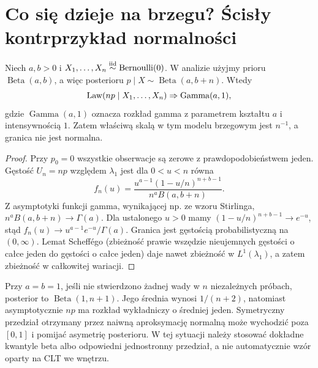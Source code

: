 \section{Co się dzieje na brzegu? Ścisły kontrprzykład normalności}
\begin{twierdzenie}[Posterior przy prawdziwym $p_0=0$]
\label{thm:boundary-beta-gamma}
Niech $a,b>0$ i $X_1,\ldots,X_n\mathrel{\overset{\mathrm{iid}}\sim}\operatorname{Bernoulli}(0)$.
W analizie użyjmy prioru $\operatorname{Beta}(a,b)$,
a więc posterioru $p\mid X\sim\operatorname{Beta}(a,b+n)$.
Wtedy
\[
 \operatorname{Law}(np\mid X_1,\ldots,X_n)
 \Rightarrow\operatorname{Gamma}(a,1),
\]
gdzie $\operatorname{Gamma}(a,1)$ oznacza rozkład gamma
z parametrem kształtu $a$ i intensywnością $1$.
Zatem właściwą skalą w tym modelu brzegowym jest $n^{-1}$,
a granica nie jest normalna.
\end{twierdzenie}
\begin{proof}
Przy $p_0=0$ wszystkie obserwacje są zerowe z
prawdopodobieństwem jeden. Gęstość $U_n=np$ względem
$\lambda_1$ jest dla $0<u<n$ równa
\[
 f_n(u)=\frac{u^{a-1}(1-u/n)^{n+b-1}}{n^a B(a,b+n)}.
\]
Z asymptotyki funkcji gamma, wynikającej np. ze wzoru
Stirlinga, $n^a B(a,b+n)\to\Gamma(a)$.
Dla ustalonego $u>0$ mamy
$(1-u/n)^{n+b-1}\to e^{-u}$, stąd
$f_n(u)\to u^{a-1}e^{-u}/\Gamma(a)$.
Granica jest gęstością probabilistyczną na $(0,\infty)$.
Lemat Scheffégo (zbieżność prawie wszędzie nieujemnych
gęstości o całce jeden do gęstości o całce jeden)
daje nawet zbieżność w $L^1(\lambda_1)$, a zatem
zbieżność w całkowitej wariacji.
\end{proof}

\begin{przyklad}
Przy $a=b=1$, jeśli nie stwierdzono żadnej wady
w $n$ niezależnych próbach, posterior to
$\operatorname{Beta}(1,n+1)$.
Jego średnia wynosi $1/(n+2)$, natomiast asymptotycznie
$n p$ ma rozkład wykładniczy o średniej jeden.
Symetryczny przedział otrzymany przez naiwną aproksymację
normalną może wychodzić poza $[0,1]$ i pomijać
asymetrię posterioru. W tej sytuacji należy stosować
dokładne kwantyle beta albo odpowiedni jednostronny
przedział, a nie automatycznie wzór oparty na CLT we wnętrzu.
\end{przyklad}

